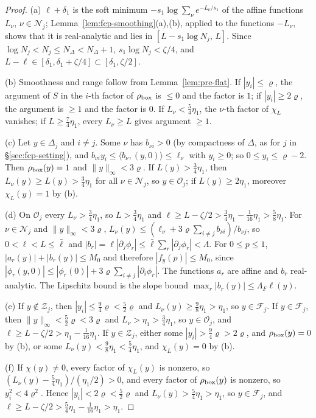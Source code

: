 \begin{proof}
(a) $\ell+\delta_1$ is the soft minimum $-s_1\log\sum_\nu e^{-L_\nu/s_1}$ of the affine functions $L_\nu$, $\nu\in\mathcal N_j$;
Lemma~\ref{lem:fcp-smoothing}(a),(b), applied to the functions $-L_\nu$, shows that it is real-analytic and lies in
$[L-s_1\log N_j,\,L]$. Since $\log N_j<N_j\le N_\Delta<N_\Delta+1$, $s_1\log N_j<\zeta/4$, and $L-\ell\in[\delta_1,\delta_1+\zeta/4]\subset[\delta_1,\zeta/2]$.

(b) Smoothness and range follow from Lemma~\ref{lem:pre-flat}. If $|y_i|\le\varrho$, the argument of $S$ in the $i$-th
factor of $\rho_{\rm box}$ is $\le0$ and the factor is $1$; if $|y_i|\ge2\varrho$, the argument is $\ge1$ and the factor is $0$.
If $L_\nu<\frac54\eta_1$, the $\nu$-th factor of $\chi_L$ vanishes; if $L\ge\frac74\eta_1$, every $L_\nu\ge L$ gives argument $\ge1$.

(c) Let $y\in\Delta_j$ and $i\ne j$. Some $\nu$ has $b_{\nu i}>0$ (by compactness of $\Delta$, as for $j$ in
\S\ref{sec:fcp-setting}), and $b_{\nu i}y_i\le\langle b_\nu,(y,0)\rangle\le\ell_\nu$ with $y_i\ge0$; so $0\le y_i\le\varrho-2$. Then
$\rho_{\rm box}(y)=1$ and $\|y\|_\infty<3\varrho$. If $L(y)>\frac34\eta_1$, then $L_\nu(y)\ge L(y)>\frac34\eta_1$ for all $\nu\in\mathcal N_j$,
so $y\in\mathcal O_j$; if $L(y)\ge2\eta_1$, moreover $\chi_L(y)=1$ by (b).

(d) On $\mathcal O_j$ every $L_\nu>\frac34\eta_1$, so $L>\frac34\eta_1$ and $\ell\ge L-\zeta/2>\frac34\eta_1-\frac1{16}\eta_1>\frac58\eta_1$. For
$\nu\in\mathcal N_j$ and $\|y\|_\infty<3\varrho$, $L_\nu(y)\le(\ell_\nu+3\varrho\sum_{i\ne j}b_{\nu i})/b_{\nu j}$, so $0<\ell<L\le\bar\ell$ and
$|b_r|=\ell|\partial_j\phi_r|\le\bar\ell\sum_r|\partial_j\phi_r|<\Lambda$. For $0\le p\le1$, $|a_r(y)|+|b_r(y)|\le M_0$ and therefore $|f_y(p)|\le M_0$, since
$|\phi_r(y,0)|\le|\phi_r(0)|+3\varrho\sum_{i\ne j}|\partial_i\phi_r|$. The functions $a_r$ are affine and $b_r$ real-analytic. The Lipschitz
bound is the slope bound $\max_r|b_r(y)|\le\Lambda_F\ell(y)$.

(e) If $y\notin\mathcal Z_j$, then $|y_i|\le\frac94\varrho<\frac52\varrho$ and $L_\nu(y)\ge\frac98\eta_1>\eta_1$, so $y\in\mathcal F_j$. If
$y\in\mathcal F_j$, then $\|y\|_\infty<\frac52\varrho<3\varrho$ and $L_\nu>\eta_1>\frac34\eta_1$, so $y\in\mathcal O_j$, and
$\ell\ge L-\zeta/2>\eta_1-\frac1{16}\eta_1$. If $y\in\mathcal Z_j$, either some $|y_i|>\frac94\varrho>2\varrho$, and $\rho_{\rm box}(y)=0$ by (b),
or some $L_\nu(y)<\frac98\eta_1<\frac54\eta_1$, and $\chi_L(y)=0$ by (b).

(f) If $\chi(y)\ne0$, every factor of $\chi_L(y)$ is nonzero, so $(L_\nu(y)-\frac54\eta_1)/(\eta_1/2)>0$, and every factor of
$\rho_{\rm box}(y)$ is nonzero, so $y_i^2<4\varrho^2$. Hence $|y_i|<2\varrho<\frac52\varrho$ and $L_\nu(y)>\frac54\eta_1>\eta_1$, so
$y\in\mathcal F_j$, and $\ell\ge L-\zeta/2>\frac54\eta_1-\frac1{16}\eta_1>\eta_1$.
\end{proof}

